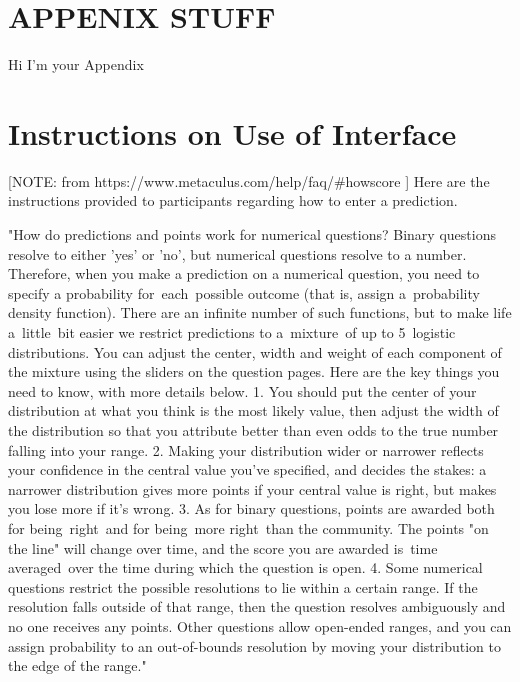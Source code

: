 \section{APPENIX STUFF}\label{appendix_basic_hop}
Hi I'm your Appendix

\section{Instructions on Use of Interface}
[NOTE: from https://www.metaculus.com/help/faq/#howscore ]
Here are the instructions provided to participants regarding how to enter a prediction.

"How do predictions and points work for numerical questions?
Binary questions resolve to either 'yes' or 'no', but numerical questions resolve to a number. Therefore, when you make a prediction on a numerical question, you need to specify a probability for each possible outcome (that is, assign a probability density function). There are an infinite number of such functions, but to make life a little bit easier we restrict predictions to a mixture of up to 5 logistic distributions. You can adjust the center, width and weight of each component of the mixture using the sliders on the question pages.
Here are the key things you need to know, with more details below.
	1.	You should put the center of your distribution at what you think is the most likely value, then adjust the width of the distribution so that you attribute better than even odds to the true number falling into your range.
	2.	Making your distribution wider or narrower reflects your confidence in the central value you've specified, and decides the stakes: a narrower distribution gives more points if your central value is right, but makes you lose more if it's wrong.
	3.	As for binary questions, points are awarded both for being right and for being more right than the community. The points "on the line" will change over time, and the score you are awarded is time averaged over the time during which the question is open.
	4.	Some numerical questions restrict the possible resolutions to lie within a certain range. If the resolution falls outside of that range, then the question resolves ambiguously and no one receives any points. Other questions allow open-ended ranges, and you can assign probability to an out-of-bounds resolution by moving your distribution to the edge of the range."









